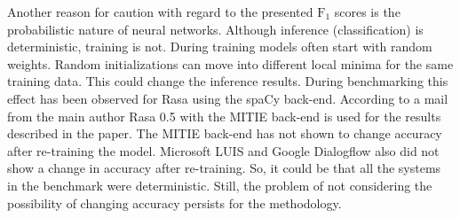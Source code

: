 Another reason for caution with regard to the presented $\text{F}_1$ scores is the probabilistic nature of neural networks.
Although inference (classification) is deterministic, training is not.
During training models often start with random weights.
Random initializations can move into different local minima for the same training data.
This could change the inference results.
During benchmarking this effect has been observed for Rasa using the spaCy back-end.
According to a mail from the main author Rasa 0.5 with the MITIE back-end is used for the results described in the paper.
The MITIE back-end has not shown to change accuracy after re-training the model.
Microsoft LUIS and Google Dialogflow also did not show a change in accuracy after re-training.
So, it could be that all the systems in the benchmark were deterministic.
Still, the problem of not considering the possibility of changing accuracy persists for the methodology.

